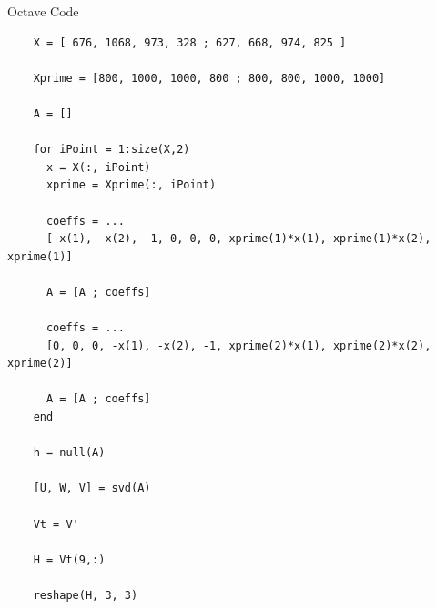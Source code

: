 \documentclass[a4paper,12pt]{article}
\begin{document}
Octave Code
\begin{lstlisting}
	X = [ 676, 1068, 973, 328 ; 627, 668, 974, 825 ]

	Xprime = [800, 1000, 1000, 800 ; 800, 800, 1000, 1000]
	
	A = []
	
	for iPoint = 1:size(X,2)
	  x = X(:, iPoint)
	  xprime = Xprime(:, iPoint)
	  
	  coeffs = ...
	  [-x(1), -x(2), -1, 0, 0, 0, xprime(1)*x(1), xprime(1)*x(2), xprime(1)]
	  
	  A = [A ; coeffs]
	  
	  coeffs = ...
	  [0, 0, 0, -x(1), -x(2), -1, xprime(2)*x(1), xprime(2)*x(2), xprime(2)]
	  
	  A = [A ; coeffs]
	end
	
	h = null(A)  
	
	[U, W, V] = svd(A)
	
	Vt = V'
	
	H = Vt(9,:)
	
	reshape(H, 3, 3)
\end{lstlisting}
\end{document}
